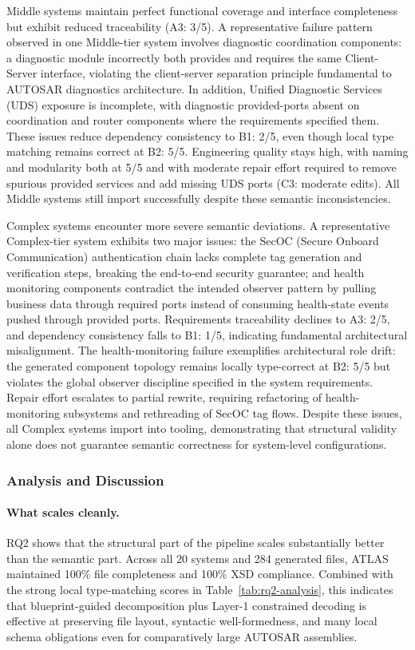 \documentclass[acmlarge,nonacm]{acmart}
\theoremstyle{acmplain}
\theoremstyle{acmdefinition}
\begin{document}
Middle systems maintain perfect functional coverage and interface completeness but exhibit reduced traceability (A3: 3/5). A representative failure pattern observed in one Middle-tier system involves diagnostic coordination components: a diagnostic module incorrectly both provides and requires the same Client-Server interface, violating the client-server separation principle fundamental to AUTOSAR diagnostics architecture. In addition, Unified Diagnostic Services (UDS) exposure is incomplete, with diagnostic provided-ports absent on coordination and router components where the requirements specified them. These issues reduce dependency consistency to B1: 2/5, even though local type matching remains correct at B2: 5/5. Engineering quality stays high, with naming and modularity both at 5/5 and with moderate repair effort required to remove spurious provided services and add missing UDS ports (C3: moderate edits). All Middle systems still import successfully despite these semantic inconsistencies.

Complex systems encounter more severe semantic deviations. A representative Complex-tier system exhibits two major issues: the SecOC (Secure Onboard Communication) authentication chain lacks complete tag generation and verification steps, breaking the end-to-end security guarantee; and health monitoring components contradict the intended observer pattern by pulling business data through required ports instead of consuming health-state events pushed through provided ports. Requirements traceability declines to A3: 2/5, and dependency consistency falls to B1: 1/5, indicating fundamental architectural misalignment. The health-monitoring failure exemplifies architectural role drift: the generated component topology remains locally type-correct at B2: 5/5 but violates the global observer discipline specified in the system requirements. Repair effort escalates to partial rewrite, requiring refactoring of health-monitoring subsystems and rethreading of SecOC tag flows. Despite these issues, all Complex systems import into tooling, demonstrating that structural validity alone does not guarantee semantic correctness for system-level configurations.



\subsubsection{Analysis and Discussion}
\label{sec:rq2-analysis}

\paragraph{What scales cleanly.}
RQ2 shows that the structural part of the pipeline scales substantially better than the semantic part. Across all 20 systems and 284 generated files, ATLAS maintained 100\% file completeness and 100\% XSD compliance. Combined with the strong local type-matching scores in Table~\ref{tab:rq2-analysis}, this indicates that blueprint-guided decomposition plus Layer-1 constrained decoding is effective at preserving file layout, syntactic well-formedness, and many local schema obligations even for comparatively large AUTOSAR assemblies.
\end{document}

